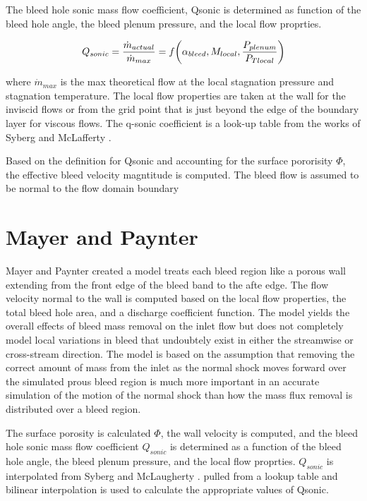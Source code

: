 \documentclass{article}
\begin{document}
The bleed hole sonic mass flow coefficient, Qsonic is determined as function of the bleed hole angle, the bleed plenum pressure, and the local flow proprties. 

$$ Q_{sonic} = \frac{\dot{m}_{actual}}{\dot{m}_{max}} = f\qty(\alpha_{bleed},M_{local},\dfrac{P_{plenum}}{P_{Tlocal}}) $$

where $\dot{m}_{max}$ is the max theoretical flow at the local stagnation pressure and stagnation temperature. The local flow properties are taken at the wall for the inviscid flows or from the grid point that is just beyond the edge of the boundary layer for viscous flows. The q-sonic coefficient is a look-up table from the works of Syberg \cite{Syberg1973} and McLafferty \cite{McLafferty1958}.

Based on the definition for Qsonic and accounting for the surface pororisity $\Phi$, the effective bleed velocity magntitude is computed. The bleed flow is assumed to be normal to the flow domain boundary


\section{Mayer and Paynter}

Mayer and Paynter \cite{Mayer1994} created a model treats each bleed region like a porous wall extending from the front edge of the bleed band to the afte edge. The flow velocity normal to the wall is computed based on the local flow properties, the total bleed hole area, and a discharge coefficient function. The model yields the overall effects of bleed mass removal on the inlet flow but does not completely model local variations in bleed that undoubtely exist in either the streamwise or cross-stream direction. The model is based on the assumption that removing the correct amount of mass from the inlet as the normal shock moves forward over the simulated prous bleed region is much more important in an accurate simulation of the motion of the normal shock than how the mass flux removal is distributed over a bleed region.

The surface porosity is calculated $\Phi$, the wall velocity is computed, and the bleed hole sonic mass flow coefficient $Q_{sonic}$ is determined as a function of the bleed hole angle, the bleed plenum pressure, and the local flow proprties. $Q_{sonic}$ is interpolated from Syberg \cite{Syberg1973} and McLaugherty \cite{McLafferty1958}. pulled from a lookup table and bilinear interpolation is used to calculate the appropriate values of Qsonic.
\end{document}
